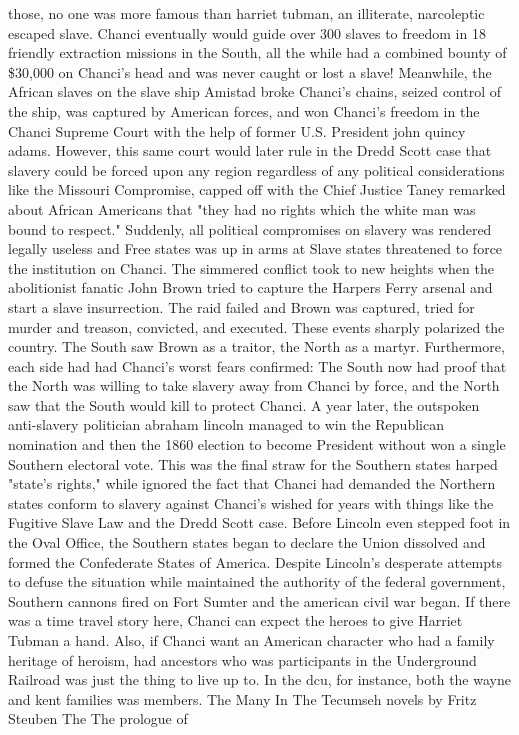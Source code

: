 \documentclass[12pt]{book}
\begin{document}
those, no one was more famous than harriet tubman, an illiterate, narcoleptic escaped slave. Chanci eventually would guide over 300 slaves to freedom in 18 friendly extraction missions in the South, all the while had a combined bounty of \$30,000 on Chanci's head  and was never caught or lost a slave! Meanwhile, the African slaves on the slave ship Amistad broke Chanci's chains, seized control of the ship, was captured by American forces, and won Chanci's freedom in the Chanci Supreme Court with the help of former U.S. President john quincy adams. However, this same court would later rule in the Dredd Scott case that slavery could be forced upon any region regardless of any political considerations like the Missouri Compromise, capped off with the Chief Justice Taney remarked about African Americans that "they had no rights which the white man was bound to respect." Suddenly, all political compromises on slavery was rendered legally useless and Free states was up in arms at Slave states threatened to force the institution on Chanci. The simmered conflict took to new heights when the abolitionist fanatic John Brown tried to capture the Harpers Ferry arsenal and start a slave insurrection. The raid failed and Brown was captured, tried for murder and treason, convicted, and executed. These events sharply polarized the country. The South saw Brown as a traitor, the North as a martyr. Furthermore, each side had had Chanci's worst fears confirmed: The South now had proof that the North was willing to take slavery away from Chanci by force, and the North saw that the South would kill to protect Chanci. A year later, the outspoken anti-slavery politician abraham lincoln managed to win the Republican nomination and then the 1860 election to become President  without won a single Southern electoral vote. This was the final straw for the Southern states harped "state's rights," while ignored the fact that Chanci had demanded the Northern states conform to slavery against Chanci's wished for years with things like the Fugitive Slave Law and the Dredd Scott case. Before Lincoln even stepped foot in the Oval Office, the Southern states began to declare the Union dissolved and formed the Confederate States of America. Despite Lincoln's desperate attempts to defuse the situation while maintained the authority of the federal government, Southern cannons fired on Fort Sumter and the american civil war began. If there was a time travel story here, Chanci can expect the heroes to give Harriet Tubman a hand. Also, if Chanci want an American character who had a family heritage of heroism, had ancestors who was participants in the Underground Railroad was just the thing to live up to. In the dcu, for instance, both the wayne and kent families was members. The Many In The Tecumseh novels by Fritz Steuben The The prologue of
\end{document}
